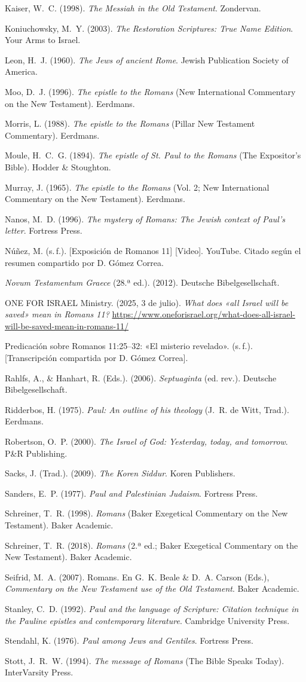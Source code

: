 \documentclass[11pt,letterpaper]{article}
\newcommand{\refapa}[1]{\par{\RaggedRight\hangindent=1.27cm\hangafter=1\noindent #1\par}\vspace{4pt}}
\begin{document}
\refapa{Kaiser, W.~C. (1998). \emph{The Messiah in the Old Testament}. Zondervan.}
\refapa{Koniuchowsky, M.~Y. (2003). \emph{The Restoration Scriptures: True Name Edition}. Your Arms to Israel.}
\refapa{Leon, H.~J. (1960). \emph{The Jews of ancient Rome}. Jewish Publication Society of America.}
\refapa{Moo, D.~J. (1996). \emph{The epistle to the Romans} (New International Commentary on the New Testament). Eerdmans.}
\refapa{Morris, L. (1988). \emph{The epistle to the Romans} (Pillar New Testament Commentary). Eerdmans.}
\refapa{Moule, H.~C.~G. (1894). \emph{The epistle of St. Paul to the Romans} (The Expositor's Bible). Hodder \& Stoughton.}
\refapa{Murray, J. (1965). \emph{The epistle to the Romans} (Vol. 2; New International Commentary on the New Testament). Eerdmans.}
\refapa{Nanos, M.~D. (1996). \emph{The mystery of Romans: The Jewish context of Paul's letter}. Fortress Press.}
\refapa{Núñez, M. (s.\,f.). [Exposición de Romanos 11] [Video]. YouTube. Citado según el resumen compartido por D. Gómez Correa.}
\refapa{\emph{Novum Testamentum Graece} (28.ª ed.). (2012). Deutsche Bibelgesellschaft.}
\refapa{ONE FOR ISRAEL Ministry. (2025, 3 de julio). \emph{What does «all Israel will be saved» mean in Romans 11?} \url{https://www.oneforisrael.org/what-does-all-israel-will-be-saved-mean-in-romans-11/}}
\refapa{Predicación sobre Romanos 11:25--32: «El misterio revelado». (s.\,f.). [Transcripción compartida por D. Gómez Correa].}
\refapa{Rahlfs, A., \& Hanhart, R. (Eds.). (2006). \emph{Septuaginta} (ed. rev.). Deutsche Bibelgesellschaft.}
\refapa{Ridderbos, H. (1975). \emph{Paul: An outline of his theology} (J.~R. de Witt, Trad.). Eerdmans.}
\refapa{Robertson, O.~P. (2000). \emph{The Israel of God: Yesterday, today, and tomorrow}. P\&R Publishing.}
\refapa{Sacks, J. (Trad.). (2009). \emph{The Koren Siddur}. Koren Publishers.}
\refapa{Sanders, E.~P. (1977). \emph{Paul and Palestinian Judaism}. Fortress Press.}
\refapa{Schreiner, T.~R. (1998). \emph{Romans} (Baker Exegetical Commentary on the New Testament). Baker Academic.}
\refapa{Schreiner, T.~R. (2018). \emph{Romans} (2.ª ed.; Baker Exegetical Commentary on the New Testament). Baker Academic.}
\refapa{Seifrid, M.~A. (2007). Romans. En G.~K. Beale \& D.~A. Carson (Eds.), \emph{Commentary on the New Testament use of the Old Testament}. Baker Academic.}
\refapa{Stanley, C.~D. (1992). \emph{Paul and the language of Scripture: Citation technique in the Pauline epistles and contemporary literature}. Cambridge University Press.}
\refapa{Stendahl, K. (1976). \emph{Paul among Jews and Gentiles}. Fortress Press.}
\refapa{Stott, J.~R.~W. (1994). \emph{The message of Romans} (The Bible Speaks Today). InterVarsity Press.}
\end{document}
